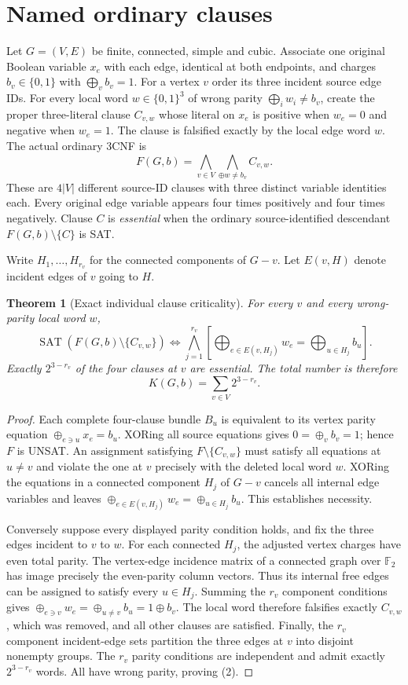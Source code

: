 \documentclass[11pt]{article}
\newtheorem{theorem}{Theorem}
\begin{document}
\section{Named ordinary clauses}
Let $G=(V,E)$ be finite, connected, simple and cubic.
Associate one original Boolean variable $x_e$ with each edge,
identical at both endpoints, and charges $b_v\in\{0,1\}$
with $\bigoplus_v b_v=1$.
For a vertex $v$ order its three incident source edge IDs.
For every local word $w\in\{0,1\}^3$ of wrong parity
$\bigoplus_i w_i\ne b_v$, create the proper three-literal clause
$C_{v,w}$ whose literal on $x_e$ is positive when $w_e=0$
and negative when $w_e=1$. The clause is falsified exactly
by the local edge word $w$.
The actual ordinary 3CNF is
\[
 F(G,b)=\bigwedge_{v\in V}\bigwedge_{\oplus w\ne b_v}C_{v,w}.
\]
These are $4|V|$ different source-ID clauses with three
distinct variable identities each. Every original edge variable
appears four times positively and four times negatively.
Clause $C$ is \emph{essential} when the ordinary
source-identified descendant $F(G,b)\setminus\{C\}$ is SAT.

Write $H_1,\ldots,H_{r_v}$ for the connected components of $G-v$.
Let $E(v,H)$ denote incident edges of $v$ going to $H$.
\begin{theorem}[Exact individual clause criticality]
For every $v$ and every wrong-parity local word $w$,
\[
\operatorname{SAT}(F(G,b)\setminus\{C_{v,w}\})
\Longleftrightarrow
\bigwedge_{j=1}^{r_v}
\left[
\bigoplus_{e\in E(v,H_j)}w_e
=\bigoplus_{u\in H_j}b_u
\right]. \tag{1}
\]
Exactly $2^{3-r_v}$ of the four clauses at $v$ are essential.
The total number is therefore
\[
\boxed{K(G,b)=\sum_{v\in V}2^{3-r_v}.} \tag{2}
\]
\end{theorem}
\begin{proof}
Each complete four-clause bundle $B_u$ is equivalent to its
vertex parity equation $\oplus_{e\ni u}x_e=b_u$.
XORing all source equations gives $0=\oplus_v b_v=1$;
hence $F$ is UNSAT. An assignment satisfying $F\setminus\{C_{v,w}\}$
must satisfy all equations at $u\ne v$ and violate the one
at $v$ precisely with the deleted local word $w$.
XORing the equations in a connected component $H_j$ of $G-v$
cancels all internal edge variables and leaves
$\oplus_{e\in E(v,H_j)}w_e=\oplus_{u\in H_j}b_u$.
This establishes necessity.

Conversely suppose every displayed parity condition holds,
and fix the three edges incident to $v$ to $w$.
For each connected $H_j$, the adjusted vertex charges have
even total parity. The vertex-edge incidence matrix of a
connected graph over $\mathbb F_2$ has image precisely
the even-parity column vectors. Thus its internal free edges
can be assigned to satisfy every $u\in H_j$.
Summing the $r_v$ component conditions gives
$\oplus_{e\ni v}w_e=\oplus_{u\ne v}b_u=1\oplus b_v$.
The local word therefore falsifies exactly $C_{v,w}$,
which was removed, and all other clauses are satisfied.
Finally, the $r_v$ component incident-edge sets partition
the three edges at $v$ into disjoint nonempty groups.
The $r_v$ parity conditions are independent and admit
exactly $2^{3-r_v}$ words. All have wrong parity, proving (2).
\end{proof}
\end{document}
